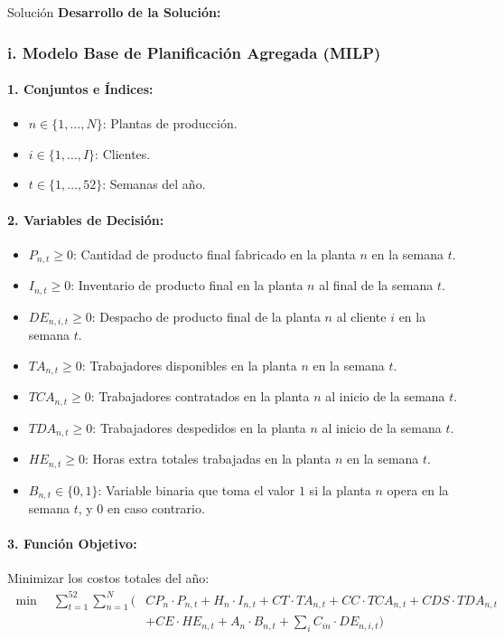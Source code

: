 \documentclass[11pt, a4paper]{article}
\begin{document}
  \medskip
  \begin{ejercicio}{Solución}
  \textbf{Desarrollo de la Solución:}

  \subsubsection*{i. Modelo Base de Planificación Agregada (MILP)}

  \paragraph{1. Conjuntos e Índices:}
  \begin{itemize}
    \item $n \in \{1, \dots, N\}$: Plantas de producción.
    \item $i \in \{1, \dots, I\}$: Clientes.
    \item $t \in \{1, \dots, 52\}$: Semanas del año.
  \end{itemize}

  \paragraph{2. Variables de Decisión:}
  \begin{itemize}
    \item $P_{n,t} \ge 0$: Cantidad de producto final fabricado en la planta $n$ en la semana $t$.
    \item $I_{n,t} \ge 0$: Inventario de producto final en la planta $n$ al final de la semana $t$.
    \item $DE_{n,i,t} \ge 0$: Despacho de producto final de la planta $n$ al cliente $i$ en la semana $t$.
    \item $TA_{n,t} \ge 0$: Trabajadores disponibles en la planta $n$ en la semana $t$.
    \item $TCA_{n,t} \ge 0$: Trabajadores contratados en la planta $n$ al inicio de la semana $t$.
    \item $TDA_{n,t} \ge 0$: Trabajadores despedidos en la planta $n$ al inicio de la semana $t$.
    \item $HE_{n,t} \ge 0$: Horas extra totales trabajadas en la planta $n$ en la semana $t$.
    \item $B_{n,t} \in \{0, 1\}$: Variable binaria que toma el valor $1$ si la planta $n$ opera en la semana $t$, y $0$ en caso contrario.
  \end{itemize}

  \paragraph{3. Función Objetivo:}
  Minimizar los costos totales del año:
  \begin{align*}
    \min \quad \sum_{t=1}^{52} \sum_{n=1}^{N} \Big( &CP_n \cdot P_{n,t} + H_n \cdot I_{n,t} + CT \cdot TA_{n,t} + CC \cdot TCA_{n,t} + CDS \cdot TDA_{n,t} \\
    &+ CE \cdot HE_{n,t} + A_n \cdot B_{n,t} + \sum_{i} C_{in} \cdot DE_{n,i,t} \Big)
  \end{align*}


\end{ejercicio}
\end{document}
